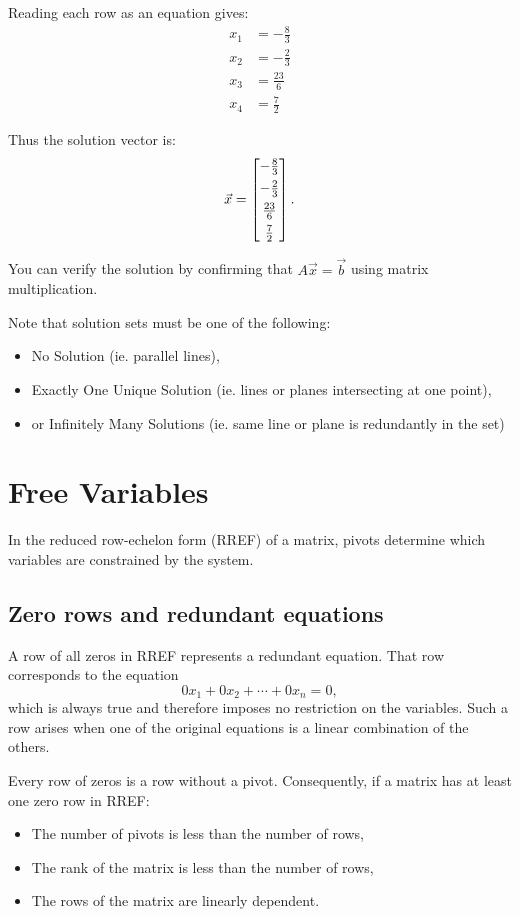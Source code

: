 Reading each row as an equation gives:
\begin{align*}
x_1 &= -\frac{8}{3}\\
x_2 &= -\frac{2}{3}\\
x_3 &= \frac{23}{6}\\
x_4 &= \frac{7}{2}
\end{align*}

Thus the solution vector is:
\[
\vec{x}=\begin{bmatrix} 
-\frac{8}{3}\\[4pt]
-\frac{2}{3}\\[4pt]
\frac{23}{6}\\[4pt]
\frac{7}{2}
 \end{bmatrix}.
\]

You can verify the solution by confirming that $A\vec{x}=\vec{b}$ using matrix multiplication.

Note that solution sets must be one of the following:
\begin{itemize}
       \item No Solution (ie. parallel lines), 
       \item Exactly One Unique Solution (ie. lines or planes intersecting at one point),
       \item or Infinitely Many Solutions (ie. same line or plane is redundantly in the set)
\end{itemize}
\section{Free Variables}

In the reduced row-echelon form (RREF) of a matrix, pivots determine which variables are constrained by the system.

\subsection{Zero rows and redundant equations}
A row of all zeros in RREF represents a redundant equation. That row corresponds to the equation
\[
0x_1 + 0x_2 + \cdots + 0x_n = 0,
\]
which is always true and therefore imposes no restriction on the variables.  
Such a row arises when one of the original equations is a linear combination of the others.

Every row of zeros is a row without a pivot. Consequently, if a matrix has at least one zero row in RREF:
\begin{itemize}
    \item The number of pivots is less than the number of rows,
    \item The rank of the matrix is less than the number of rows,
    \item The rows of the matrix are linearly dependent.
\end{itemize}

